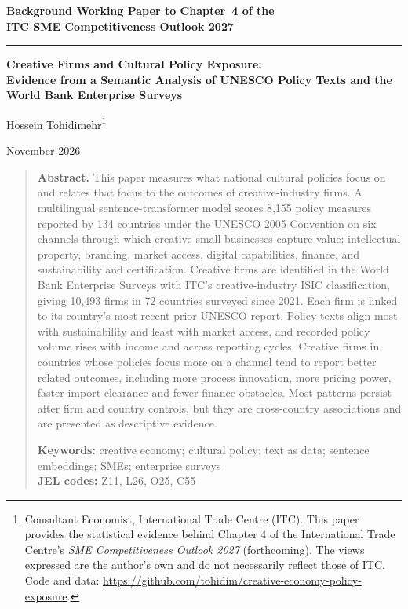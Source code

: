 \documentclass[11pt]{article}
\begin{document}
\begin{center}
{\normalsize\bfseries Background Working Paper to Chapter~4 of the\\ ITC SME Competitiveness Outlook 2027}\par\vspace{4pt}
\rule{0.35\linewidth}{0.4pt}\par\vspace{10pt}
{\Large\bfseries Creative Firms and Cultural Policy Exposure:\\[2pt]
Evidence from a Semantic Analysis of UNESCO Policy Texts and the World Bank Enterprise Surveys}\par\vspace{14pt}
{\large Hossein Tohidimehr}\footnote{Consultant Economist, International Trade Centre (ITC). This paper provides the statistical evidence behind Chapter 4 of the International Trade Centre's \emph{SME Competitiveness Outlook 2027} (forthcoming). The views expressed are the author's own and do not necessarily reflect those of ITC. Code and data: \url{https://github.com/tohidim/creative-economy-policy-exposure}.}\par\vspace{6pt}
{November 2026}
\end{center}

\vspace{6pt}
\begin{quote}
\small\textbf{Abstract.} This paper measures what national cultural policies focus on and relates that focus to the outcomes of creative-industry firms. A multilingual sentence-transformer model scores 8,155 policy measures reported by 134 countries under the UNESCO 2005 Convention on six channels through which creative small businesses capture value: intellectual property, branding, market access, digital capabilities, finance, and sustainability and certification. Creative firms are identified in the World Bank Enterprise Surveys with ITC's creative-industry ISIC classification, giving 10,493 firms in 72 countries surveyed since 2021. Each firm is linked to its country's most recent prior UNESCO report. Policy texts align most with sustainability and least with market access, and recorded policy volume rises with income and across reporting cycles. Creative firms in countries whose policies focus more on a channel tend to report better related outcomes, including more process innovation, more pricing power, faster import clearance and fewer finance obstacles. Most patterns persist after firm and country controls, but they are cross-country associations and are presented as descriptive evidence.

\medskip
\textbf{Keywords:} creative economy; cultural policy; text as data; sentence embeddings; SMEs; enterprise surveys\\
\textbf{JEL codes:} Z11, L26, O25, C55
\end{quote}
\end{document}

